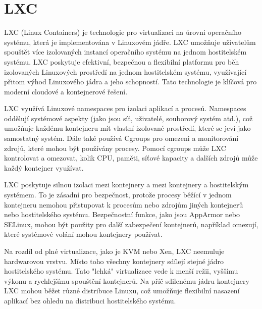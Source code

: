 \section{LXC}
LXC (Linux Containers) je technologie pro virtualizaci na úrovni operačního systému, která je implementována v Linuxovém jádře. LXC umožňuje uživatelům spouštět více izolovaných instancí operačního systému na jednom hostitelském systému. LXC poskytuje efektivní, bezpečnou a flexibilní platformu pro běh izolovaných Linuxových prostředí na jednom hostitelském systému, využívající přitom výhod Linuxového jádra a jeho schopností. Tato technologie je klíčová pro moderní cloudové a kontejnerové řešení.

     LXC využívá Linuxové namespaces pro izolaci aplikací a procesů. Namespaces oddělují systémové aspekty (jako jsou síť, uživatelé, souborový systém atd.), což umožňuje každému kontejneru mít vlastní izolované prostředí, které se jeví jako samostatný systém. Dále také používá Cgroups pro omezeni a monitorování zdrojů, které mohou být používány procesy. Pomocí cgroups může LXC kontrolovat a omezovat, kolik CPU, paměti, síťové kapacity a dalších zdrojů může každý kontejner využívat.

    LXC poskytuje silnou izolaci mezi kontejnery a mezi kontejnery a hostitelským systémem. To je zásadní pro bezpečnost, protože procesy běžící v jednom kontejneru nemohou přistupovat k procesům nebo zdrojům jiných kontejnerů nebo hostitelského systému. Bezpečnostní funkce, jako jsou AppArmor nebo SELinux, mohou být použity pro další zabezpečení kontejnerů, například omezují, které systémové volání mohou kontejnery používat.

    Na rozdíl od plné virtualizace, jako je KVM nebo Xen, LXC neemuluje hardwarovou vrstvu. Místo toho všechny kontejnery sdílejí stejné jádro hostitelského systému. Tato "lehká" virtualizace vede k menší režii, vyššímu výkonu a rychlejšímu spouštění kontejnerů. Na příč sdilenému jádru kontejnery LXC mohou běžet různé distribuce Linuxu, což umožňuje flexibilní nasazení aplikací bez ohledu na distribuci hostitelského systému.

